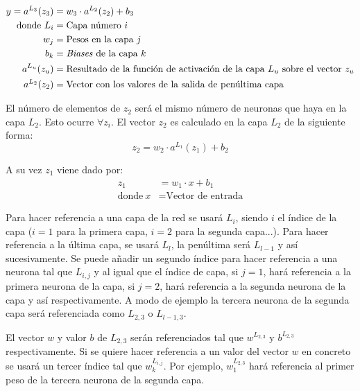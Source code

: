 \begin{equation}
    \begin{split}
    y = a^{L_3}(z_3) &= w_3 \cdot a^{L_2}(z_2) + b_3 \\ 
    \text{donde}~L_i &= \text{Capa número  } i \\
  ~w_j &= \text{Pesos en la capa } j \\ 
  ~b_k &= \text{\textit{Biases} de la capa } k \\
  ~a^{L_{u}}(z_{u}) &= \text{Resultado de la función de activación de la capa } L_{u} \text{ sobre el vector } z_u \\
  ~a^{L_2}(z_2) &= \text{Vector con los valores de la salida de penúltima capa}
  \end{split}
  \label{eqn:layer3}
\end{equation}

El número de elementos de $z_2$ será el mismo número de neuronas que haya en la capa $L_2$. Esto ocurre $\forall z_i$. El vector $z_2$ es calculado en la capa $L_2$ de la siguiente forma:
\begin{equation}
    z_2 = w_2 \cdot a^{L_1}(z_1) + b_2
  \label{eqn:layer2}
\end{equation}

A su vez  $z_1$ viene dado por:
\begin{equation}
    \begin{split}
    z_1 &= w_1 \cdot x + b_1 \\
    \text{donde}~x &= \text{Vector de entrada}
  \end{split}
  \label{eqn:layer1}
\end{equation}

Para hacer referencia a una capa de la red se usará $L_i$, siendo $i$ el índice de la capa ($i=1$ para la primera capa, $i=2$ para la segunda capa...). Para hacer referencia a la última capa, se usará $L_l$, la penúltima será $L_{l-1}$ y así sucesivamente. Se puede añadir un segundo índice para hacer referencia a una neurona tal que $L_{i, j}$ y al igual que el índice de capa, si $j=1$, hará referencia a la primera neurona de la capa, si $j=2$, hará referencia a la segunda neurona de la capa y así respectivamente. A modo de ejemplo la tercera neurona de la segunda capa será referenciada como $L_{2, 3}$ o $L_{l-1, 3}$.
\newline

El vector $w$ y valor $b$ de $L_{2, 3}$ serán referenciados tal que $w^{L_{2,3}}$ y $b^{L_{2,3}}$ respectivamente. Si se quiere hacer referencia a un valor del vector $w$ en concreto se usará un tercer índice tal que $w^{L_{i,j}}_k$. Por ejemplo, $w^{L_{2,3}}_1$ hará referencia al primer peso de la tercera neurona de la segunda capa.
\newline

